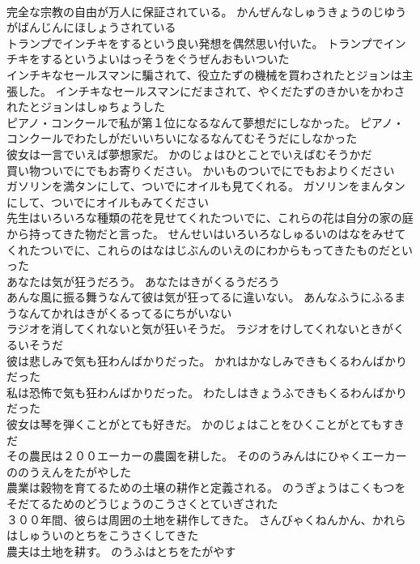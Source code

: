 \documentclass[8pt]{extreport}
\begin{document}
\begin{CJK}{UTF8}{min}
\\	完全な宗教の自由が万人に保証されている。	かんぜんなしゅうきょうのじゆうがばんじんにほしょうされている 
\\	トランプでインチキをするという良い発想を偶然思い付いた。	トランプでインチキをするというよいはっそうをぐうぜんおもいついた 
\\	インチキなセールスマンに騙されて、役立たずの機械を買わされたとジョンは主張した。	インチキなセールスマンにだまされて、やくだたずのきかいをかわされたとジョンはしゅちょうした 
\\	ピアノ・コンクールで私が第１位になるなんて夢想だにしなかった。	ピアノ・コンクールでわたしがだいいちいになるなんてむそうだにしなかった 
\\	彼女は一言でいえば夢想家だ。	かのじょはひとことでいえばむそうかだ 
\\	買い物ついでにでもお寄りください。	かいものついでにでもおよりください 
\\	ガソリンを満タンにして、ついでにオイルも見てくれる。	ガソリンをまんタンにして、ついでにオイルもみてください 
\\	先生はいろいろな種類の花を見せてくれたついでに、これらの花は自分の家の庭から持ってきた物だと言った。	せんせいはいろいろなしゅるいのはなをみせてくれたついでに、これらのはなはじぶんのいえのにわからもってきたものだといった 
\\	あなたは気が狂うだろう。	あなたはきがくるうだろう 
\\	あんな風に振る舞うなんて彼は気が狂ってるに違いない。	あんなふうにふるまうなんてかれはきがくるってるにちがいない 
\\	ラジオを消してくれないと気が狂いそうだ。	ラジオをけしてくれないときがくるいそうだ 
\\	彼は悲しみで気も狂わんばかりだった。	かれはかなしみできもくるわんばかりだった 
\\	私は恐怖で気も狂わんばかりだった。	わたしはきょうふできもくるわんばかりだった 
\\	彼女は琴を弾くことがとても好きだ。	かのじょはことをひくことがとてもすきだ 
\\	その農民は２００エーカーの農園を耕した。	そののうみんはにひゃくエーカーののうえんをたがやした 
\\	農業は穀物を育てるための土壌の耕作と定義される。	のうぎょうはこくもつをそだてるためのどうじょうのこうさくとていぎされた 
\\	３００年間、彼らは周囲の土地を耕作してきた。	さんびゃくねんかん、かれらはしゅういのとちをこうさくしてきた 
\\	農夫は土地を耕す。	のうふはとちをたがやす 

\end{CJK}
\end{document}
